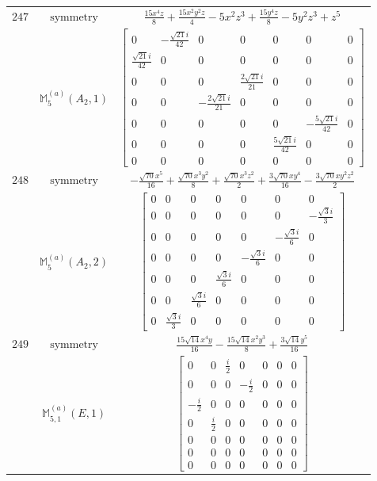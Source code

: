 \documentclass[fleqn,8pt,landscape]{jsarticle}
\begin{document}
\begin{longtable}{ccc}
$ 247 $ & $ \text{symmetry} $ & $ \frac{15 x^{4} z}{8} + \frac{15 x^{2} y^{2} z}{4} - 5 x^{2} z^{3} + \frac{15 y^{4} z}{8} - 5 y^{2} z^{3} + z^{5} $ \\
$  $ & $ \mathbb{M}_{5}^{(a)}(A_{2},1) $ & $ \begin{bmatrix} 0 & - \frac{\sqrt{21} i}{42} & 0 & 0 & 0 & 0 & 0 \\ \frac{\sqrt{21} i}{42} & 0 & 0 & 0 & 0 & 0 & 0 \\ 0 & 0 & 0 & \frac{2 \sqrt{21} i}{21} & 0 & 0 & 0 \\ 0 & 0 & - \frac{2 \sqrt{21} i}{21} & 0 & 0 & 0 & 0 \\ 0 & 0 & 0 & 0 & 0 & - \frac{5 \sqrt{21} i}{42} & 0 \\ 0 & 0 & 0 & 0 & \frac{5 \sqrt{21} i}{42} & 0 & 0 \\ 0 & 0 & 0 & 0 & 0 & 0 & 0 \end{bmatrix} $ \\ \hline
$ 248 $ & $ \text{symmetry} $ & $ - \frac{\sqrt{70} x^{5}}{16} + \frac{\sqrt{70} x^{3} y^{2}}{8} + \frac{\sqrt{70} x^{3} z^{2}}{2} + \frac{3 \sqrt{70} x y^{4}}{16} - \frac{3 \sqrt{70} x y^{2} z^{2}}{2} $ \\
$  $ & $ \mathbb{M}_{5}^{(a)}(A_{2},2) $ & $ \begin{bmatrix} 0 & 0 & 0 & 0 & 0 & 0 & 0 \\ 0 & 0 & 0 & 0 & 0 & 0 & - \frac{\sqrt{3} i}{3} \\ 0 & 0 & 0 & 0 & 0 & - \frac{\sqrt{3} i}{6} & 0 \\ 0 & 0 & 0 & 0 & - \frac{\sqrt{3} i}{6} & 0 & 0 \\ 0 & 0 & 0 & \frac{\sqrt{3} i}{6} & 0 & 0 & 0 \\ 0 & 0 & \frac{\sqrt{3} i}{6} & 0 & 0 & 0 & 0 \\ 0 & \frac{\sqrt{3} i}{3} & 0 & 0 & 0 & 0 & 0 \end{bmatrix} $ \\ \hline
$ 249 $ & $ \text{symmetry} $ & $ \frac{15 \sqrt{14} x^{4} y}{16} - \frac{15 \sqrt{14} x^{2} y^{3}}{8} + \frac{3 \sqrt{14} y^{5}}{16} $ \\
$  $ & $ \mathbb{M}_{5,1}^{(a)}(E,1) $ & $ \begin{bmatrix} 0 & 0 & \frac{i}{2} & 0 & 0 & 0 & 0 \\ 0 & 0 & 0 & - \frac{i}{2} & 0 & 0 & 0 \\ - \frac{i}{2} & 0 & 0 & 0 & 0 & 0 & 0 \\ 0 & \frac{i}{2} & 0 & 0 & 0 & 0 & 0 \\ 0 & 0 & 0 & 0 & 0 & 0 & 0 \\ 0 & 0 & 0 & 0 & 0 & 0 & 0 \\ 0 & 0 & 0 & 0 & 0 & 0 & 0 \end{bmatrix} $ \\ \hline

\end{longtable}
\end{document}
